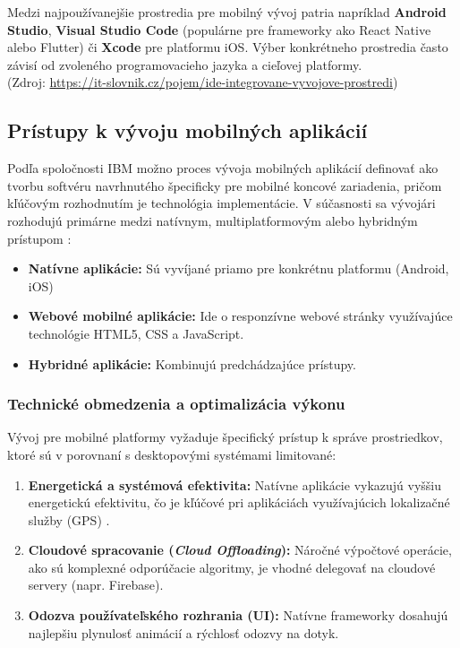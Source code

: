 Medzi najpoužívanejšie prostredia pre mobilný vývoj patria napríklad \textbf{Android Studio}, \textbf{Visual Studio Code} (populárne pre frameworky ako React Native alebo Flutter) či \textbf{Xcode} pre platformu iOS. Výber konkrétneho prostredia často závisí od zvoleného programovacieho jazyka a cieľovej platformy.
\\ (Zdroj: \url{https://it-slovnik.cz/pojem/ide-integrovane-vyvojove-prostredi})

  \fi

\subsection{Prístupy k vývoju mobilných aplikácií}
Podľa spoločnosti IBM možno proces vývoja mobilných aplikácií definovať ako tvorbu softvéru navrhnutého 
špecificky pre mobilné koncové zariadenia, pričom kľúčovým rozhodnutím je technológia implementácie. 
V súčasnosti sa vývojári rozhodujú primárne medzi natívnym, multiplatformovým alebo hybridným prístupom \cite{ibm_mobile_app_dev}:

\begin{itemize}[noitemsep]
    \item \textbf{Natívne aplikácie:} Sú vyvíjané priamo pre konkrétnu platformu (Android, iOS)
    \item \textbf{Webové mobilné aplikácie:} Ide o responzívne webové stránky využívajúce technológie HTML5, CSS a JavaScript.
    \item \textbf{Hybridné aplikácie:} Kombinujú predchádzajúce prístupy.
\end{itemize} \cite{olsav2024mobilna}


  \iffalse\subsubsection{Technické obmedzenia a optimalizácia výkonu}
Vývoj pre mobilné platformy vyžaduje špecifický prístup k správe prostriedkov, ktoré sú v porovnaní s desktopovými systémami limitované:

\begin{enumerate}
    \item \textbf{Energetická a systémová efektivita:} Natívne aplikácie vykazujú vyššiu energetickú efektivitu, čo je kľúčové pri aplikáciách využívajúcich lokalizačné služby (GPS) \cite{pullur_medium_2025}.
    \item \textbf{Cloudové spracovanie (\textit{Cloud Offloading}):} Náročné výpočtové operácie, ako sú komplexné odporúčacie algoritmy, je vhodné delegovať na cloudové servery (napr. Firebase).
    \item \textbf{Odozva používateľského rozhrania (UI):} Natívne frameworky dosahujú najlepšiu plynulosť animácií a rýchlosť odozvy na dotyk.
\end{enumerate}

